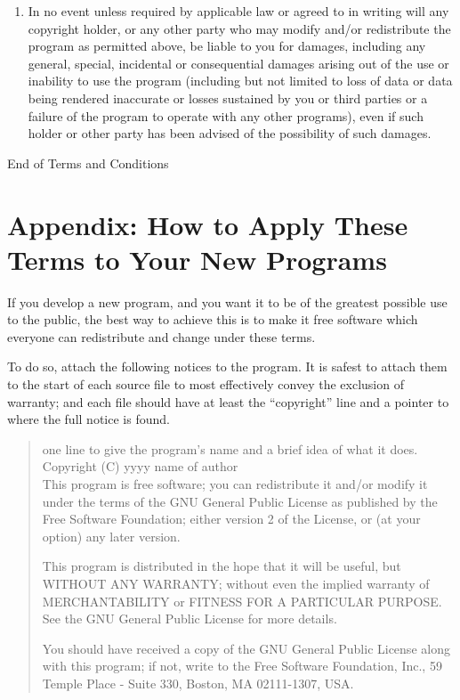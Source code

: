 \documentclass{article}
\begin{document}
\begin{enumerate}
\item
{\sc In no event unless required by applicable law or agreed to in writing
will any copyright holder, or any other party who may modify and/or
redistribute the program as permitted above, be liable to you for damages,
including any general, special, incidental or consequential damages arising
out of the use or inability to use the program (including but not limited
to loss of data or data being rendered inaccurate or losses sustained by
you or third parties or a failure of the program to operate with any other
programs), even if such holder or other party has been advised of the
possibility of such damages.}

\end{enumerate}


\begin{center}
{\Large\sc End of Terms and Conditions}
\end{center}


\clearpage

\section*{Appendix: How to Apply These Terms to Your New Programs}

If you develop a new program, and you want it to be of the greatest
possible use to the public, the best way to achieve this is to make it
free software which everyone can redistribute and change under these
terms.

  To do so, attach the following notices to the program.  It is safest to
  attach them to the start of each source file to most effectively convey
  the exclusion of warranty; and each file should have at least the
  ``copyright'' line and a pointer to where the full notice is found.

\begin{quote}
one line to give the program's name and a brief idea of what it does. \\
Copyright (C) yyyy  name of author \\

This program is free software; you can redistribute it and/or modify
it under the terms of the GNU General Public License as published by
the Free Software Foundation; either version 2 of the License, or
(at your option) any later version.

This program is distributed in the hope that it will be useful,
but WITHOUT ANY WARRANTY; without even the implied warranty of
MERCHANTABILITY or FITNESS FOR A PARTICULAR PURPOSE.  See the
GNU General Public License for more details.

You should have received a copy of the GNU General Public License
along with this program; if not, write to the Free Software
Foundation, Inc., 59 Temple Place - Suite 330, Boston, MA  02111-1307, USA.
\end{quote}
\end{document}
